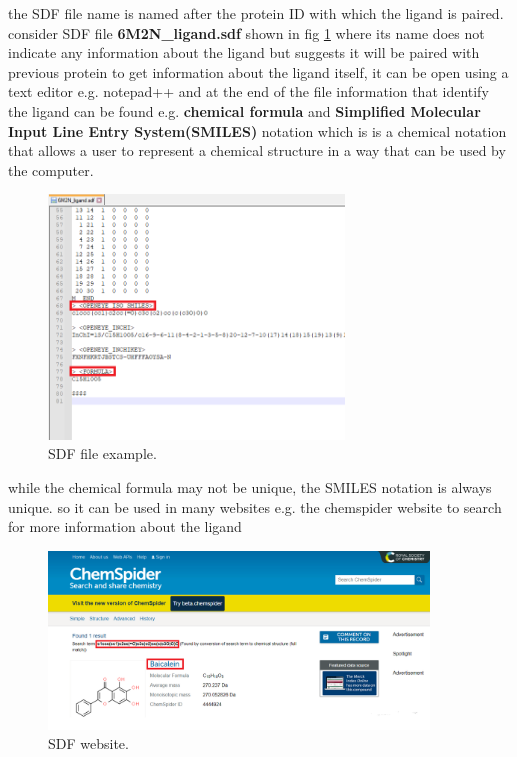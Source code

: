 \documentclass[11pt, a4paper]{article}
\begin{document}
    the SDF file name is named after the protein ID with which the ligand is paired. consider SDF file \textbf{6M2N\_ligand.sdf} shown in fig \ref{fig 5} where its name does not indicate any information about the ligand but suggests it will be paired with previous protein
    to get information about the ligand itself, it can be open using a text editor e.g. notepad++ and at the end of the file information that identify the ligand can be found e.g. \textbf{chemical formula} and \textbf{Simplified Molecular Input Line Entry System(SMILES)} notation which is is a chemical notation that allows a user to represent a chemical structure in a way that can be used by the computer.
    
    \begin{figure}[h]
        \centering
        \includegraphics[width=0.7\textwidth]{sdf file.PNG} %
        \caption{SDF file example.}
        \label{fig 5}
    \end{figure}

    while the chemical formula may not be unique, the SMILES notation is always unique. so it can be used in many websites e.g. the chemspider website\cite{6}  to search for more information about the ligand

    \begin{figure}[h]
        \centering
        \includegraphics[width=0.9\textwidth]{sdf website.PNG} %
        \caption{SDF website.}
        \label{fig 6}
    \end{figure}
\end{document}
